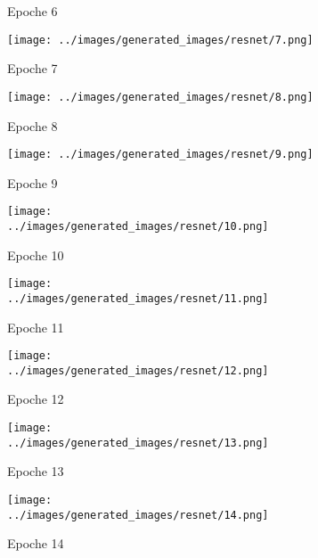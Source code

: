 \begin{figure}[H]
\begin{subfigure}[b]{0.1\textwidth}
   \caption{Epoche 6}
 \end{subfigure}
 \hspace{1em}%
 \begin{subfigure}[b]{0.1\textwidth}
   \centering
   \texttt{[image: ../images/generated\_images/resnet/7.png]}
   \caption{Epoche 7}
 \end{subfigure}
 \hspace{1em}%
 \begin{subfigure}[b]{0.1\textwidth}
 \centering
 \texttt{[image: ../images/generated\_images/resnet/8.png]}
 \caption{Epoche 8}
 \end{subfigure}
 \hspace{1em}%
 \begin{subfigure}[b]{0.1\textwidth}
   \centering
   \texttt{[image: ../images/generated\_images/resnet/9.png]}
   \caption{Epoche 9}
 \end{subfigure}
 \hspace{1em}%
 \begin{subfigure}[b]{0.1\textwidth}
   \centering
   \texttt{[image: ../images/generated\_images/resnet/10.png]}
   \caption{Epoche 10}
 \end{subfigure}
 \hspace{1em}%
 \begin{subfigure}[b]{0.1\textwidth}
   \centering
   \texttt{[image: ../images/generated\_images/resnet/11.png]}
   \caption{Epoche 11}
 \end{subfigure}
 \hspace{1em}%
 \begin{subfigure}[b]{0.1\textwidth}
 \centering
 \texttt{[image: ../images/generated\_images/resnet/12.png]}
 \caption{Epoche 12}
 \end{subfigure}
 \hspace{1em}%
 \begin{subfigure}[b]{0.1\textwidth}
   \centering
   \texttt{[image: ../images/generated\_images/resnet/13.png]}
   \caption{Epoche 13}
 \end{subfigure}
 \hspace{1em}%
 \begin{subfigure}[b]{0.1\textwidth}
   \centering
   \texttt{[image: ../images/generated\_images/resnet/14.png]}
   \caption{Epoche 14}
 \end{subfigure}
 \hspace{1em}%
 \begin{subfigure}[b]{0.1\textwidth}

\end{subfigure}
\end{figure}

